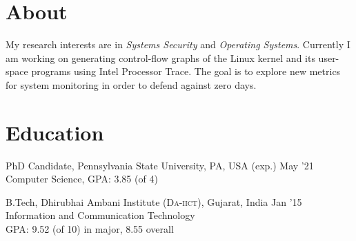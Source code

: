 \documentclass[margin]{res}
\newcommand{\daiict}{\textsc{Da-iict}}
\begin{document}
\raggedright
{} %

\address{
    blog:// \href{http://adityabasu.me}{adityabasu.me}\\
    github:// \href{https://github.com/mitthu}{mitthu}\\
    linkedIn://  \href{https://www.linkedin.com/in/mitthu}{mitthu}
}

\address{
    W106 Westgate Building\\
    University Park, PA 16802\\
    (814) 862-8300\\
    \href{mailto:aditya.basu@psu.edu}{aditya.basu@psu.edu}
}

\begin{resume}

\section{About}
My research interests are in \emph{Systems Security} and \emph{Operating Systems}.
Currently I am working on generating control-flow graphs of the Linux kernel and its 
user-space programs using Intel\textsuperscript{\textregistered} Processor Trace.
The goal is to explore new metrics for system monitoring in order to defend against zero days.

\section{Education}

PhD Candidate, Pennsylvania State University, PA, USA \hfill (exp.) May '21\\
Computer Science, GPA: 3.85 (of 4)

B.Tech, Dhirubhai Ambani Institute (\daiict), Gujarat, India \hfill Jan '15\\
Information and Communication Technology\\
GPA: 9.52 (of 10) in major,
8.55 overall 


\end{resume}
\end{document}
